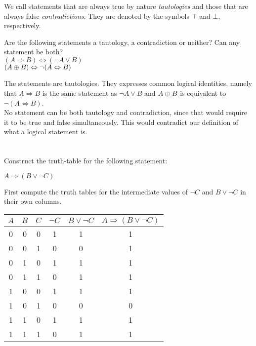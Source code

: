 We call statements that are always true by nature \emph{tautologies} and
those that are always false \emph{contradictions}. They are denoted by the
symbols \(\top\) and \(\bot\), respectively.

\begin{exercise}
  Are the following statements a tautology, a contradiction or neither?
  Can any statement be both?\\
  \((A \Rightarrow B) \Leftrightarrow (\neg A \lor B)\)\\
  \((A \oplus B) \Leftrightarrow \neg (A \Leftrightarrow B)\)

  \begin{sol}
    The statements are tautologies. They expresses common logical identities, namely
    that \(A \Rightarrow B\) is the same statement as \(\neg A \lor B\)
    and \(A \oplus B\) is equivalent to \(\neg (A \Leftrightarrow B)\).\\
    No statement can be both tautology and contradiction, since that would
    require it to be true and false simultaneously. This would contradict our
    definition of what a logical statement is.
  \end{sol}
\end{exercise}

\section{\problemhead}
\begin{problem}
  Construct the truth-table for the following statement:\\
  \begin{center}
    \(A \Rightarrow (B \lor \neg C)\)
  \end{center}

  \begin{hint}
    First compute the truth tables for the intermediate values of \(\neg C\) and
    \(B \lor \neg C\) in their own columns.
  \end{hint}

  \begin{sol}
    \begin{tabular}{ccc cc c}
      \(A\) & \(B\) & \(C\) & \(\neg C\) & \(B \lor \neg C\) &
      \(A \Rightarrow (B \lor \neg C)\)\\
      \midrule
      0 & 0 & 0 & 1 & 1 & 1\\
      0 & 0 & 1 & 0 & 0 & 1\\
      0 & 1 & 0 & 1 & 1 & 1\\
      0 & 1 & 1 & 0 & 1 & 1\\
      1 & 0 & 0 & 1 & 1 & 1\\
      1 & 0 & 1 & 0 & 0 & 0\\
      1 & 1 & 0 & 1 & 1 & 1\\
      1 & 1 & 1 & 0 & 1 & 1\\
    \end{tabular}
  \end{sol}
\end{problem}
